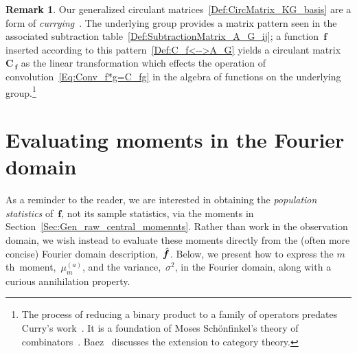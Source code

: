 \documentclass[letterpaper,11pt]{article}
\newcommand{\bs}[1]{{\boldsymbol{#1}}}
\newcommand{\gr}[1]{( #1 )}
\newcommand{\dimin}[2]{{ #1 }^{\gr{#2}}}
\newcommand{\hatbsf}{{\kern+0.25em}\hat{{\kern-0.25em}\bs{f}}}
\newcommand{\mth}{$m$th}
\theoremstyle{definition} \newtheorem{remark}{Remark}
\begin{document}
\begin{remark}
Our generalized circulant matrices~\eqref{Def:CircMatrix_KG_basis} are a form of \emph{currying}~\cite{curry1958combinatory}. The underlying group provides a matrix pattern seen in the associated subtraction table~\eqref{Def:SubtractionMatrix_A_G_ij}; a function~$\bs{f}$ inserted according to this pattern~\eqref{Def:C_f<-->A_G} yields a circulant matrix~$\bs{C}_{\:\!\!\bs{f}}$ as the linear transformation which effects the operation of convolution~\eqref{Eq:Conv_f*g=C_fg} in the algebra of functions on the underlying group.\footnote{The process of reducing a binary product to a family of operators predates Curry's work~\cite{Frege1893FREGDA2}. It is a foundation of Moses Sch\"onfinkel's theory of combinators~\cite{schonfinkel1924buildingBlocksLogic,wolfram2021combinators}. Baez~\cite{baez2011aRosettaStone} discusses the extension to category theory.}
\end{remark}


\section{Evaluating moments in the Fourier domain} \label{Sec:Moments_in_Fourier_domain}
As a reminder to the reader, we are interested in obtaining the \emph{population statistics} of~$\bs{f}$, not its sample statistics, via the moments in Section~\ref{Sec:Gen_raw_central_momennts}. Rather than work in the observation domain, we wish instead to evaluate these moments directly from the (often more concise) Fourier domain description,~$\hatbsf$. Below, we present how to express the \mth\ moment,~$\dimin{\mu}{a}_m$, and the variance,~$\sigma^2$, in the Fourier domain, along with a curious annihilation property.
\end{document}
